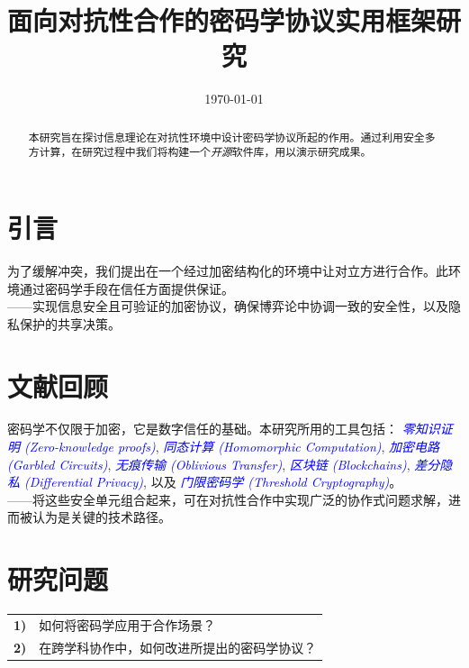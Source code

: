 \documentclass[conference]{IEEEtran}
\date{\today}
\begin{document}
\title{面向对抗性合作的密码学协议实用框架研究}

\author{
}

\maketitle

\begin{abstract}
本研究旨在探讨信息理论在对抗性环境中设计密码学协议所起的作用。通过利用安全多方计算，在研究过程中我们将构建一个\textit{开源}软件库，用以演示研究成果。
\end{abstract}

\section{引言}
为了缓解冲突，我们提出在一个经过加密结构化的环境中让对立方进行合作。此环境通过密码学手段在信任方面提供保证。\\
——实现信息安全且可验证的加密协议，确保博弈论中协调一致的安全性，以及隐私保护的共享决策。

\section{文献回顾}
密码学不仅限于加密，它是数字信任的基础。本研究所用的工具包括：
\textcolor{blue}{\textit{零知识证明 (Zero-knowledge proofs)}}, 
\textcolor{blue}{\textit{同态计算 (Homomorphic Computation)}}, 
\textcolor{blue}{\textit{加密电路 (Garbled Circuits)}}, 
\textcolor{blue}{\textit{无痕传输 (Oblivious Transfer)}}, 
\textcolor{blue}{\textit{区块链 (Blockchains)}}, 
\textcolor{blue}{\textit{差分隐私 (Differential Privacy)}}, 
以及 
\textcolor{blue}{\textit{门限密码学 (Threshold Cryptography)}}。\\
——将这些安全单元组合起来，可在对抗性合作中实现广泛的协作式问题求解，进而被认为是关键的技术路径。

\vspace{5pt}
\section{研究问题}

\begin{tabular}{lp{210pt}}
    {\small \textbf{1)}} & {\small 如何将密码学应用于合作场景？} \\
    {\small \textbf{2)}} & {\small 在跨学科协作中，如何改进所提出的密码学协议？}
\end{tabular}
    
\end{document}
